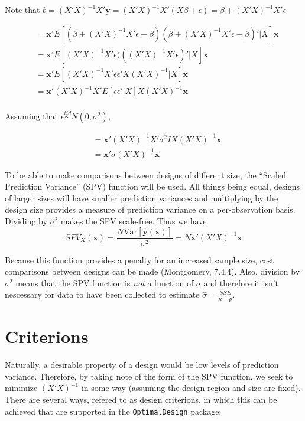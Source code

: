 \documentclass{article}\usepackage[]{graphicx}\usepackage[]{color}
\newcommand{\Var}{\mathrm{Var}}
\begin{document}
Note that $b=(X'X)^{-1} X'\textbf{y} = (X'X)^{-1}X'(X\beta+\epsilon) = \beta + (X'X)^{-1} X'\epsilon$

\begin{align*}
  &= \textbf{x}' E[(\beta + (X'X)^{-1}X'\epsilon - \beta)(\beta + (X'X)^{-1}X'\epsilon - \beta)' | X] \textbf{x} \\
  &= \textbf{x}' E[(X'X)^{-1}X'\epsilon)((X'X)^{-1}X'\epsilon)' | X] \textbf{x} \\
  &= \textbf{x}' E[(X'X)^{-1}X'\epsilon \epsilon' X (X'X)^{-1} | X] \textbf{x} \\
  &= \textbf{x}' (X'X)^{-1} X' E[\epsilon \epsilon' | X] X(X'X)^{-1} \textbf{x} \\
\end{align*}

Assuming that $\epsilon \stackrel{iid}{\sim} N(0,\sigma^2) $,

\begin{align*}
  &= \textbf{x}' (X'X)^{-1} X' \sigma^2 I X(X'X)^{-1} \textbf{x} \\
  &= \textbf{x}' \sigma (X' X)^{-1} \textbf{x}
\end{align*}

To be able to make comparisons between designs of different size, the ``Scaled Prediction Variance'' (SPV) function will be used. All things being equal, designs of larger sizes will have smaller prediction variances and multiplying by the design size provides a measure of prediction variance on a per-observation basis. Dividing by $\sigma^2$ makes the SPV scale-free. Thus we have
$$ SPV_X(\textbf{x}) = \frac{N \Var[\hat{\textbf{y}}(\textbf{x})]}{\sigma^2} = N \textbf{x}' (X' X)^{-1} \textbf{x} $$

Because this function provides a penalty for an increased sample size, cost comparisons between designs can be made (Montgomery, 7.4.4). Also, division by $\sigma^2$ means that the SPV function is \textit{not} a function of $\sigma$ and therefore it isn't nescessary for data to have been collected to estimate $\hat{\sigma} = \frac{SSE}{n-p}$.

\section{Criterions}
Naturally, a desirable property of a design would be low levels of prediction variance. Therefore, by taking note of the form of the SPV function, we seek to minimize $(X'X)^{-1}$ in some way (assuming the design region and size are fixed). There are several ways, refered to as design criterions, in which this can be achieved that are supported in the \texttt{OptimalDesign} package:
\end{document}
